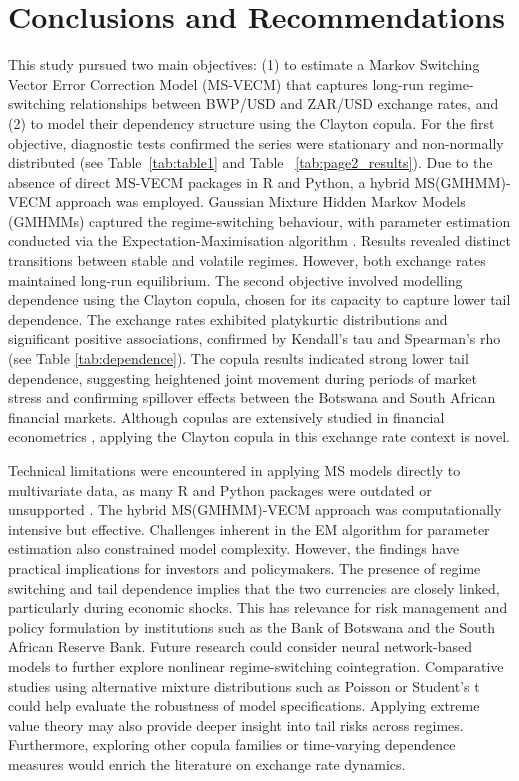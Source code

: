 \documentclass[a4paper]{article}
\theoremstyle{plain}
\theoremstyle{definition}
\theoremstyle{remark}
\begin{document}
\section{Conclusions and Recommendations}

This study pursued two main objectives: (1) to estimate a Markov Switching Vector Error Correction Model (MS-VECM) that captures long-run regime-switching relationships between BWP/USD and ZAR/USD exchange rates, and (2) to model their dependency structure using the Clayton copula. For the first objective, diagnostic tests confirmed the series were stationary and non-normally distributed (see Table~\ref{tab:table1} and Table ~\ref{tab:page2_results}). Due to the absence of direct MS-VECM packages in R and Python, a hybrid MS(GMHMM)-VECM approach was employed. Gaussian Mixture Hidden Markov Models (GMHMMs) captured the regime-switching behaviour, with parameter estimation conducted via the Expectation-Maximisation algorithm \citep{bilmes1998gentle}. Results revealed distinct transitions between stable and volatile regimes. However, both exchange rates maintained long-run equilibrium. The second objective involved modelling dependence using the Clayton copula, chosen for its capacity to capture lower tail dependence. The exchange rates exhibited platykurtic distributions and significant positive associations, confirmed by Kendall’s tau and Spearman’s rho (see Table \ref{tab:dependence}). The copula results indicated strong lower tail dependence, suggesting heightened joint movement during periods of market stress and confirming spillover effects between the Botswana and South African financial markets. Although copulas are extensively studied in financial econometrics \citep{molefe2020roads, LIU2020106808}, applying the Clayton copula in this exchange rate context is novel.

Technical limitations were encountered in applying MS models directly to multivariate data, as many R and Python packages were outdated or unsupported \citep{github2020, msbvar2016, mswm2021}. The hybrid MS(GMHMM)-VECM approach was computationally intensive but effective. Challenges inherent in the EM algorithm for parameter estimation \citep{pmlr-v23-anandkumar12} also constrained model complexity.
However, the findings have practical implications for investors and policymakers. The presence of regime switching and tail dependence implies that the two currencies are closely linked, particularly during economic shocks. This has relevance for risk management and policy formulation by institutions such as the Bank of Botswana and the South African Reserve Bank. 
Future research could consider neural network-based models to further explore  nonlinear regime-switching cointegration. Comparative studies using alternative mixture distributions such as Poisson or Student’s t could help evaluate the robustness of model specifications. Applying extreme value theory may also provide deeper insight into tail risks across regimes. Furthermore, exploring other copula families or time-varying dependence measures would enrich the literature on exchange rate dynamics.
\end{document}
